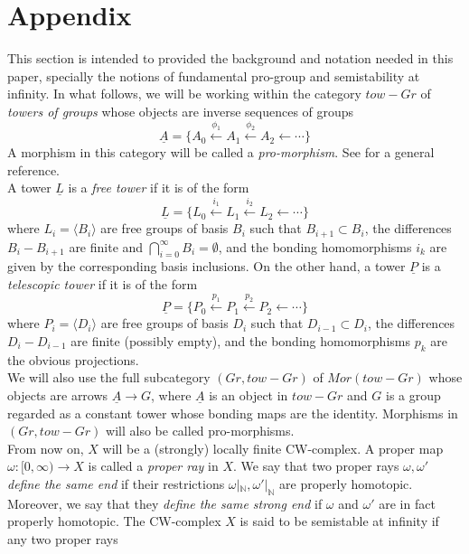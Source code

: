 \documentclass{amsart}[12pt]
\theoremstyle{definition}
\theoremstyle{remark}
\numberwithin{equation}{section}
\begin{document}
\section{Appendix} \label{appendix}
This section is intended to provided the background and notation
needed in this paper, specially the notions of fundamental
pro-group and semistability at infinity. In what follows, we will
be working within the category $tow-Gr$ of {\it towers of groups}
whose objects are inverse sequences of groups
$$\underline{A} = \{ A_0 \stackrel{\phi_1}{\longleftarrow} A_1 \stackrel{\phi_2}{\longleftarrow} A_2 {\longleftarrow} \cdots \}$$
A morphism in this category will be called a {\it pro-morphism}.
See \cite{Geo, MarSe}
for a general reference.\\
\indent A tower $\underline{L}$ is a {\it free tower} if it is of
the form
$$\underline{L} = \{ L_0 \stackrel{i_1}{\longleftarrow} L_1 \stackrel{i_2}{\longleftarrow} L_2 {\longleftarrow} \cdots \}$$
where $L_i = \langle B_i \rangle$ are free groups of basis $B_i$
such that $B_{i+1} {\subset} B_i$, the differences $B_i - B_{i+1}$ are
finite and $\bigcap_{i=0}^{\infty} B_i = \emptyset$, and the
bonding homomorphisms $i_k$ are given by the corresponding basis
inclusions. On the other hand, a tower $\underline{P}$ is a {\it
telescopic tower} if it is of the form
$$\underline{P} = \{ P_0 \stackrel{p_1}{\longleftarrow} P_1 \stackrel{p_2}{\longleftarrow} P_2 {\longleftarrow} \cdots \}$$
where $P_i = \langle D_i \rangle$ are free groups of basis $D_i$
such that $D_{i-1} {\subset} D_i$, the differences $D_i - D_{i-1}$ are
finite (possibly empty),
and the bonding homomorphisms $p_k$ are the obvious projections.\\
\indent We will also use the full subcategory $(Gr, tow-Gr)$ of
$Mor(tow-Gr)$ whose objects are arrows $\underline{A} {\longrightarrow} G$,
where $\underline{A}$ is an object in $tow-Gr$ and $G$ is a group
regarded as a constant tower whose bonding maps are the identity.
Morphisms in $(Gr, tow-Gr)$ will also be
called pro-morphisms.\\
\indent From now on, $X$ will be a (strongly) locally finite
CW-complex. A proper map $\omega : [0, \infty) {\longrightarrow} X$ is called a
{\it proper ray} in $X$. We say that two proper rays $\omega,
\omega'$ {\it define the same end} if their restrictions
$\omega|_{\mathbb N}, \omega'|_{\mathbb N}$ are properly homotopic. Moreover, we
say that they {\it define the same strong end} if $\omega$ and
$\omega'$ are in fact properly homotopic. The CW-complex $X$ is
said to be semistable at infinity if any two proper rays
\end{document}
